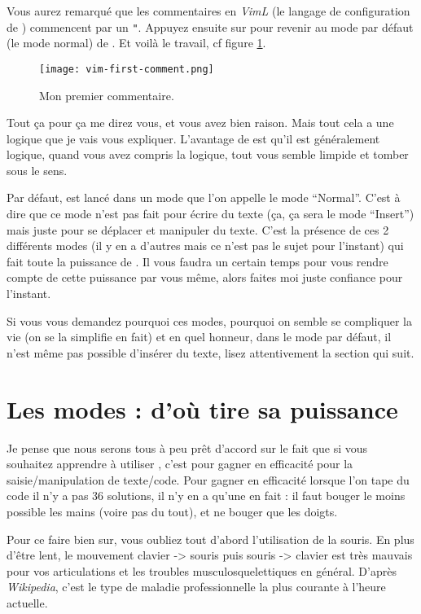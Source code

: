 Vous aurez remarqué que les commentaires en \emph{VimL} (le langage de configuration de \vim) commencent par un \Verb|"|. Appuyez ensuite sur \ttesc pour revenir au mode par défaut (le mode normal) de \vim. Et voilà le travail, cf figure \ref{fig:vim-first-comment}.

\begin{figure}%
  \texttt{[image: vim-first-comment.png]}
  \caption{Mon premier commentaire.}
  \label{fig:vim-first-comment}
\end{figure}

Tout ça pour ça me direz vous, et vous avez bien raison. Mais tout cela a une logique que je vais vous expliquer. L'avantage de \vim est qu'il est généralement logique, quand vous avez compris la logique, tout vous semble limpide et tomber sous le sens.

Par défaut, \vim est lancé dans un mode que l'on appelle le mode ``Normal''. C'est à dire que ce mode n'est pas fait pour écrire du texte (ça, ça sera le mode ``Insert'') mais juste pour se déplacer et manipuler du texte. C'est la présence de ces 2 différents modes (il y en a d'autres mais ce n'est pas le sujet pour l'instant) qui fait toute la puissance de \vim. Il vous faudra un certain temps pour vous rendre compte de cette puissance par vous même, alors faites moi juste confiance pour l'instant.

Si vous vous demandez pourquoi ces modes, pourquoi on semble se compliquer la vie (on se la simplifie en fait) et en quel honneur, dans le mode par défaut, il n'est même pas possible d'insérer du texte, lisez attentivement la section qui suit.

\section{Les modes : d'où \vim tire sa puissance}

Je pense que nous serons tous à peu prêt d'accord sur le fait que si vous souhaitez apprendre à utiliser \vim, c'est pour gagner en efficacité pour la saisie/manipulation de texte/code. Pour gagner en efficacité lorsque l'on tape du code il n'y a pas 36 solutions, il n'y en a qu'une en fait : il faut bouger le moins possible les mains (voire pas du tout), et ne bouger que les doigts.

Pour ce faire bien sur, vous oubliez tout d'abord l'utilisation de la souris. En plus d'être lent, le mouvement clavier -> souris puis souris -> clavier est très mauvais pour vos articulations et les troubles musculosquelettiques en général. D'après \emph{Wikipedia}, c'est le type de maladie professionnelle la plus courante à l'heure actuelle.

